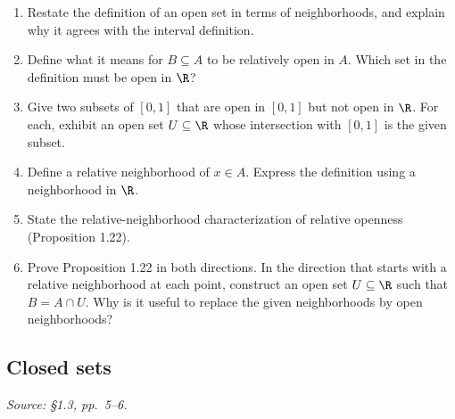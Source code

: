 \begin{enumerate}[resume]
  \item Restate the definition of an open set in terms of neighborhoods,
    and explain why it agrees with the interval definition.

  \item Define what it means for \(B\subseteq A\) to be relatively open
    in \(A\). Which set in the definition must be open in \(\R\)?

  \item Give two subsets of \([0,1]\) that are open in \([0,1]\) but
    not open in \(\R\). For each, exhibit an open set \(U\subseteq\R\)
    whose intersection with \([0,1]\) is the given subset.

  \item Define a relative neighborhood of \(x\in A\).
    Express the definition using a neighborhood in \(\R\).

  \item State the relative-neighborhood characterization of relative
    openness (Proposition 1.22).

  \item Prove Proposition 1.22 in both directions. In the direction that
    starts with a relative neighborhood at each point, construct an open
    set \(U\subseteq\R\) such that \(B=A\cap U\).
    Why is it useful to replace the given neighborhoods by open neighborhoods?
\end{enumerate}

\subsection{Closed sets}
\textit{Source: \S1.3, pp.~5--6.}

